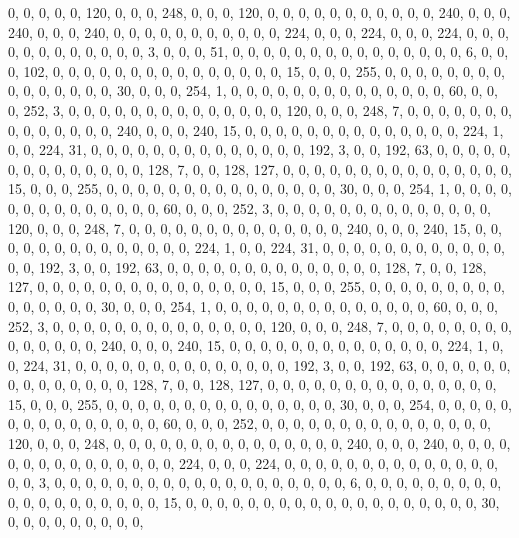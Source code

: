 \begin{DoxyCode}
       0, 0, 0, 0, 0, 120, 0, 0, 0, 248, 0, 0, 0, 120, 0, 0, 0, 0, 0, 0, 0, 0, 0, 0, 0, 240, 0, 0, 0, 240, 0, 0, 0,
       240, 0, 0, 0, 0, 0, 0, 0, 0, 0, 0, 0, 224, 0, 0, 0, 224, 0, 0, 0, 224, 0, 0, 0, 0, 0, 0, 0, 0, 0, 0, 0, 0,
       3, 0, 0, 0, 51, 0, 0, 0, 0, 0, 0, 0, 0, 0, 0, 0, 0, 0, 0, 0, 6, 0, 0, 0, 102, 0, 0, 0, 0, 0, 0, 0, 0, 0, 0,
       0, 0, 0, 0, 0, 15, 0, 0, 0, 255, 0, 0, 0, 0, 0, 0, 0, 0, 0, 0, 0, 0, 0, 0, 0, 30, 0, 0, 0, 254, 1, 0, 0, 0,
       0, 0, 0, 0, 0, 0, 0, 0, 0, 0, 0, 60, 0, 0, 0, 252, 3, 0, 0, 0, 0, 0, 0, 0, 0, 0, 0, 0, 0, 0, 0, 120, 0, 0, 0,
       248, 7, 0, 0, 0, 0, 0, 0, 0, 0, 0, 0, 0, 0, 0, 0, 240, 0, 0, 0, 240, 15, 0, 0, 0, 0, 0, 0, 0, 0, 0, 0, 0,
       0, 0, 0, 224, 1, 0, 0, 224, 31, 0, 0, 0, 0, 0, 0, 0, 0, 0, 0, 0, 0, 0, 0, 192, 3, 0, 0, 192, 63, 0, 0, 0, 0,
       0, 0, 0, 0, 0, 0, 0, 0, 0, 0, 128, 7, 0, 0, 128, 127, 0, 0, 0, 0, 0, 0, 0, 0, 0, 0, 0, 0, 0, 0, 0, 15, 0, 0,
       0, 255, 0, 0, 0, 0, 0, 0, 0, 0, 0, 0, 0, 0, 0, 0, 0, 30, 0, 0, 0, 254, 1, 0, 0, 0, 0, 0, 0, 0, 0, 0, 0, 0,
       0, 0, 0, 60, 0, 0, 0, 252, 3, 0, 0, 0, 0, 0, 0, 0, 0, 0, 0, 0, 0, 0, 0, 120, 0, 0, 0, 248, 7, 0, 0, 0, 0, 0,
       0, 0, 0, 0, 0, 0, 0, 0, 0, 240, 0, 0, 0, 240, 15, 0, 0, 0, 0, 0, 0, 0, 0, 0, 0, 0, 0, 0, 0, 224, 1, 0, 0,
       224, 31, 0, 0, 0, 0, 0, 0, 0, 0, 0, 0, 0, 0, 0, 0, 192, 3, 0, 0, 192, 63, 0, 0, 0, 0, 0, 0, 0, 0, 0, 0, 0, 0,
       0, 0, 128, 7, 0, 0, 128, 127, 0, 0, 0, 0, 0, 0, 0, 0, 0, 0, 0, 0, 0, 0, 0, 15, 0, 0, 0, 255, 0, 0, 0, 0, 0,
       0, 0, 0, 0, 0, 0, 0, 0, 0, 0, 30, 0, 0, 0, 254, 1, 0, 0, 0, 0, 0, 0, 0, 0, 0, 0, 0, 0, 0, 0, 60, 0, 0, 0,
       252, 3, 0, 0, 0, 0, 0, 0, 0, 0, 0, 0, 0, 0, 0, 0, 120, 0, 0, 0, 248, 7, 0, 0, 0, 0, 0, 0, 0, 0, 0, 0, 0, 0,
       0, 0, 240, 0, 0, 0, 240, 15, 0, 0, 0, 0, 0, 0, 0, 0, 0, 0, 0, 0, 0, 0, 224, 1, 0, 0, 224, 31, 0, 0, 0, 0, 0,
       0, 0, 0, 0, 0, 0, 0, 0, 0, 192, 3, 0, 0, 192, 63, 0, 0, 0, 0, 0, 0, 0, 0, 0, 0, 0, 0, 0, 0, 128, 7, 0, 0,
       128, 127, 0, 0, 0, 0, 0, 0, 0, 0, 0, 0, 0, 0, 0, 0, 0, 15, 0, 0, 0, 255, 0, 0, 0, 0, 0, 0, 0, 0, 0, 0, 0, 0,
       0, 0, 0, 30, 0, 0, 0, 254, 0, 0, 0, 0, 0, 0, 0, 0, 0, 0, 0, 0, 0, 0, 0, 60, 0, 0, 0, 252, 0, 0, 0, 0, 0, 0,
       0, 0, 0, 0, 0, 0, 0, 0, 0, 120, 0, 0, 0, 248, 0, 0, 0, 0, 0, 0, 0, 0, 0, 0, 0, 0, 0, 0, 0, 240, 0, 0, 0, 240,
       0, 0, 0, 0, 0, 0, 0, 0, 0, 0, 0, 0, 0, 0, 0, 224, 0, 0, 0, 224, 0, 0, 0, 0, 0, 0, 0, 0, 0, 0, 0, 0, 0, 0,
       0, 0, 3, 0, 0, 0, 0, 0, 0, 0, 0, 0, 0, 0, 0, 0, 0, 0, 0, 0, 0, 0, 6, 0, 0, 0, 0, 0, 0, 0, 0, 0, 0, 0, 0, 0,
       0, 0, 0, 0, 0, 0, 15, 0, 0, 0, 0, 0, 0, 0, 0, 0, 0, 0, 0, 0, 0, 0, 0, 0, 0, 0, 30, 0, 0, 0, 0, 0, 0, 0, 0, 0,

\end{DoxyCode}
